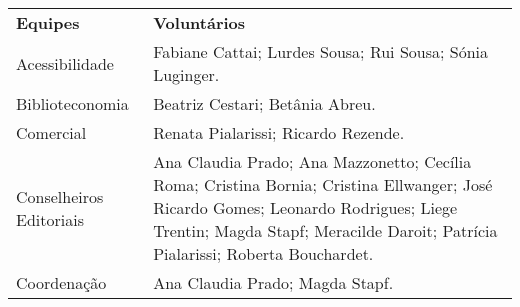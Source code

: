 \documentclass[
]{article}
\begin{document}
\begin{longtable}[]{@{}
  >{\raggedright\arraybackslash}p{}
  >{\raggedright\arraybackslash}p{}@{}}
\toprule\noalign{}
\begin{minipage}[b]{\linewidth}\centering
\textbf{Equipes}
\end{minipage} & \begin{minipage}[b]{\linewidth}\centering
\textbf{Voluntários}
\end{minipage} \\
\begin{minipage}[b]{\linewidth}\raggedright
Acessibilidade
\end{minipage} & \begin{minipage}[b]{\linewidth}\raggedright
Fabiane Cattai; Lurdes Sousa; Rui Sousa; Sónia Luginger.
\end{minipage} \\
\begin{minipage}[b]{\linewidth}\raggedright
Biblioteconomia
\end{minipage} & \begin{minipage}[b]{\linewidth}\raggedright
Beatriz Cestari; Betânia Abreu.
\end{minipage} \\
\begin{minipage}[b]{\linewidth}\raggedright
Comercial
\end{minipage} & \begin{minipage}[b]{\linewidth}\raggedright
Renata Pialarissi; Ricardo Rezende.
\end{minipage} \\
\begin{minipage}[b]{\linewidth}\raggedright
Conselheiros Editoriais
\end{minipage} & \begin{minipage}[b]{\linewidth}\raggedright
Ana Claudia Prado; Ana Mazzonetto; Cecília Roma; Cristina Bornia; Cristina Ellwanger; José Ricardo Gomes; Leonardo Rodrigues; Liege Trentin; Magda Stapf; Meracilde Daroit; Patrícia Pialarissi; Roberta Bouchardet.
\end{minipage} \\
\begin{minipage}[b]{\linewidth}\raggedright
Coordenação
\end{minipage} & \begin{minipage}[b]{\linewidth}\raggedright
Ana Claudia Prado; Magda Stapf.
\end{minipage} \\

\end{longtable}
\end{document}
